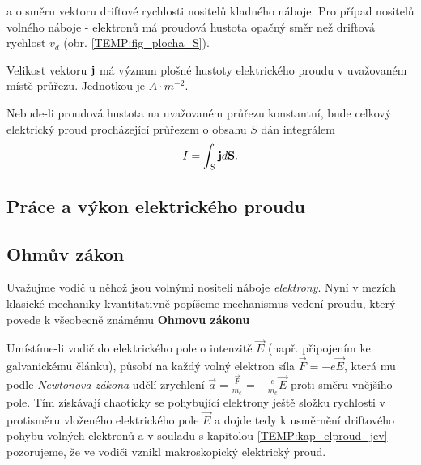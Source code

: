       a o směru vektoru driftové rychlosti nositelů kladného náboje. Pro případ nositelů volného
      náboje - elektronů má proudová hustota opačný směr než driftová rychlost $v_d$ (obr.
      \ref{TEMP:fig_plocha_S}).
      
      Velikost vektoru $\mathbf{j}$ má význam plošné hustoty elektrického proudu v uvažovaném místě
      průřezu. Jednotkou je $A\cdot m^{-2}$.
      
      Nebude-li proudová hustota na uvažovaném průřezu konstantní, bude celkový elektrický proud
      procházející průřezem o obsahu $S$ dán integrálem 
        \begin{equation}\label{TEMP:eq_I_10}
          I = \int_S \mathbf{j}d\mathbf{S}. 
        \end{equation} 

        

        

    \subsection{Práce a výkon elektrického proudu}
        
 
    \subsection{Ohmův zákon}
      Uvažujme vodič u něhož jsou volnými nositeli náboje \emph{elektrony}. Nyní v mezích klasické
      mechaniky kvantitativně popíšeme mechanismus vedení proudu, který povede k všeobecně známému
      \textbf{Ohmovu zákonu}
      
      Umístíme-li vodič do elektrického pole o intenzitě $\vec{E}$ (např. připojením ke
      galvanickému článku), působí na každý volný elektron síla $\vec{F} = -e\vec{E}$, která mu
      podle \emph{Newtonova zákona} udělí zrychlení $\vec{a} = \frac{\vec{F}}{m_e} = -
      \frac{e}{m_e}\vec{E}$ proti směru vnějšího pole. Tím získávají chaoticky se pohybující
      elektrony ještě složku rychlosti v protisměru vloženého elektrického pole $\vec{E}$ a  dojde
      tedy k usměrnění driftového pohybu volných elektronů a v souladu s kapitolou
      \ref{TEMP:kap_elproud_jev} pozorujeme, že ve vodiči vznikl makroskopický elektrický proud.
      
